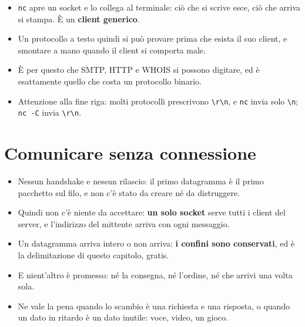 \begin{itemize}
    \item \texttt{nc} apre un socket e lo collega al terminale: ciò che si scrive esce, ciò che arriva si stampa. È un
          \textbf{client generico}.
    \item Un protocollo a testo quindi si può provare prima che esista il suo client, e smontare a mano quando il client si
          comporta male.
    \item È per questo che SMTP, HTTP e WHOIS si possono digitare, ed è esattamente quello che costa un protocollo binario.
    \item Attenzione alla fine riga: molti protocolli prescrivono \texttt{\textbackslash r\textbackslash n}, e
          \texttt{nc} invia solo \texttt{\textbackslash n}; \texttt{nc -C} invia \texttt{\textbackslash r\textbackslash n}.
\end{itemize}

\section{Comunicare senza connessione}


\begin{itemize}
    \item Nessun handshake e nessun rilascio: il primo datagramma è il primo pacchetto sul filo, e non c'è stato da creare né
          da distruggere.
    \item Quindi non c'è niente da accettare: \textbf{un solo socket} serve tutti i client del server, e l'indirizzo del
          mittente arriva con ogni messaggio.
    \item Un datagramma arriva intero o non arriva: \textbf{i confini sono conservati}, ed è la delimitazione di questo
          capitolo, gratis.
    \item E nient'altro è promesso: né la consegna, né l'ordine, né che arrivi una volta sola.
    \item Ne vale la pena quando lo scambio è una richiesta e una risposta, o quando un dato in ritardo è un dato inutile:
          voce, video, un gioco.
\end{itemize}

